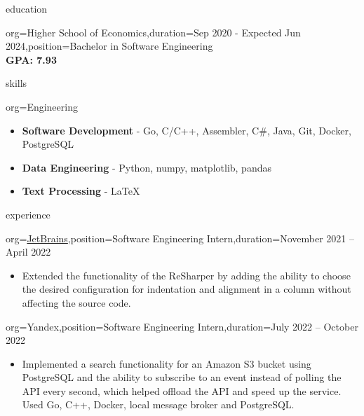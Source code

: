 \documentclass{resume}
\begin{document}
\makeheader

\begin{ResumeSection}{education}
    \begin{ResumeSubsection}{org={Higher School of Economics},duration={Sep 2020 - Expected Jun 2024},position={Bachelor in Software Engineering}}
        \\\bf GPA: 7.93 
    \end{ResumeSubsection}
\end{ResumeSection}


\begin{ResumeSection}{skills}
    \newcommand{\skill}[2]{\textbf{#1} - #2}
    \begin{ResumeSubsection}{org=Engineering}
        \begin{itemize}
            \item \skill{Software Development}{Go, C/C++, Assembler, C\#, Java, Git, Docker, PostgreSQL}
            \item \skill{Data Engineering}{Python, numpy, matplotlib, pandas}
            \item \skill{Text Processing}{LaTeX}
        \end{itemize}
    \end{ResumeSubsection}
\end{ResumeSection}

\begin{ResumeSection}{experience}
    \begin{ResumeSubsection}{org=\href{https://www.jetbrains.com/}{JetBrains},position={Software Engineering Intern},duration=November 2021 – April 2022}
        \begin{itemize}
            \item {
                Extended the functionality of the ReSharper by adding the ability to choose the desired configuration for indentation and alignment in a column without affecting the source code.
            }
        \end{itemize}
    \end{ResumeSubsection}

    \begin{ResumeSubsection}{org=Yandex,position={Software Engineering Intern},duration=July 2022 – October 2022}
        \begin{itemize}
            \item {
                Implemented a search functionality for an Amazon S3 bucket using PostgreSQL and the ability to subscribe to an event instead of polling the API every second, which helped offload the API and speed up the service. Used Go, C++, Docker, local message broker and PostgreSQL.
            }
        \end{itemize}
    \end{ResumeSubsection}
\end{ResumeSection}
\end{document}
